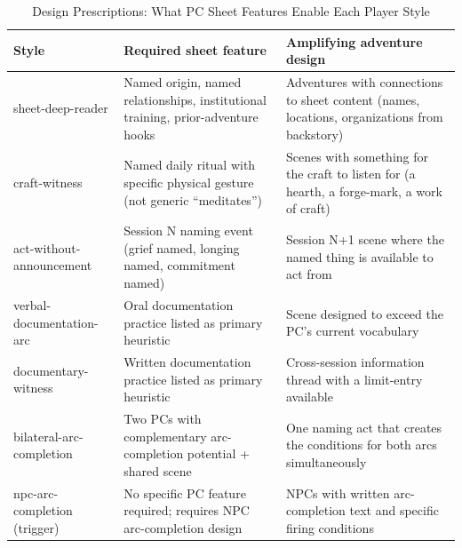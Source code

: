 \begin{table}[t]
\caption{Design Prescriptions: What PC Sheet Features Enable Each Player Style}
\label{tab:design-prescriptions}
\begin{tabular}{@{}lp{4.5cm}p{4.5cm}@{}}
\toprule
Style & Required sheet feature & Amplifying adventure design \\
\midrule
sheet-deep-reader & Named origin, named relationships, institutional training, prior-adventure hooks & Adventures with connections to sheet content (names, locations, organizations from backstory) \\
craft-witness & Named daily ritual with specific physical gesture (not generic ``meditates'') & Scenes with something for the craft to listen for (a hearth, a forge-mark, a work of craft) \\
act-without-announcement & Session N naming event (grief named, longing named, commitment named) & Session N+1 scene where the named thing is available to act from \\
verbal-documentation-arc & Oral documentation practice listed as primary heuristic & Scene designed to exceed the PC's current vocabulary \\
documentary-witness & Written documentation practice listed as primary heuristic & Cross-session information thread with a limit-entry available \\
bilateral-arc-completion & Two PCs with complementary arc-completion potential + shared scene & One naming act that creates the conditions for both arcs simultaneously \\
npc-arc-completion (trigger) & No specific PC feature required; requires NPC arc-completion design & NPCs with written arc-completion text and specific firing conditions \\
\bottomrule
\end{tabular}
\end{table}
